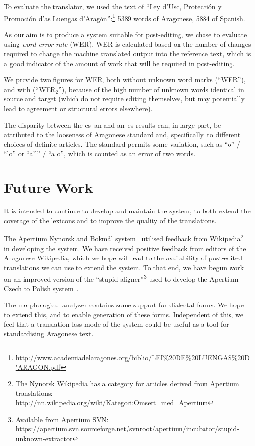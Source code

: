 \documentclass[10pt,a4paper,twocolumn]{article}
\begin{document}
  To evaluate the translator, we used the text of ``Ley d'Uso, Protección y Promoción d'as Luengas d'Aragón'':\footnote{\url{http://www.academiadelaragones.org/biblio/LEI\%20DE\%20LUENGAS\%20D'ARAGON.pdf}} 5389 words of Aragonese, 5884 of Spanish.
  
  As our aim is to produce a system suitable for post-editing, we chose to evaluate using \emph{word error rate} (WER). WER is calculated based on the number of changes required to change the machine translated output into the reference text, which is a good indicator of the amount of work that will be required in post-editing.
  
  We provide two figures for WER, both without unknown word marks (``WER''), and with (``WER$_2$''), because of the high number of unknown words identical in source and target (which do not require editing themselves, but may potentially lead to agreement or structural errors elsewhere).
  
  The disparity between the es--an and an--es results can, in large part, be attributed to the looseness of Aragonese standard and, specifically, to different choices of definite articles. The standard permits some variation, such as ``o'' / ``lo''  or ``a'l'' / ``a o'', which is counted as an error of two words.
  
  \section{Future Work}
  
  It is intended to continue to develop and maintain the system, to both extend the coverage of the lexicons and to improve the quality of the translations.
  
  The Apertium Nynorsk and Bokmål system~\cite{Unhammer} utilised feedback from Wikipedia\footnote{The Nynorsk Wikipedia has a category for articles derived from Apertium translations: {\small \url{http://nn.wikipedia.org/wiki/Kategori:Omsett_med_Apertium}}} in developing the system. We have received positive feedback from editors of the Aragonese Wikipedia, which we hope will lead to the availability of post-edited translations we can use to extend the system. 
To that end, we have begun work on an improved version of the ``stupid aligner''\footnote{Available from Apertium SVN: \url{https://apertium.svn.sourceforge.net/svnroot/apertium/incubator/stupid-unknown-extractor}} used to develop the Apertium Czech to Polish system~\cite{Ruth}.
  
  The morphological analyser contains some support for dialectal forms. We hope to extend this, and to enable generation of these forms. Independent of this, we feel that a translation-less mode of the system could be useful as a tool for standardising Aragonese text.
  
\end{document}
